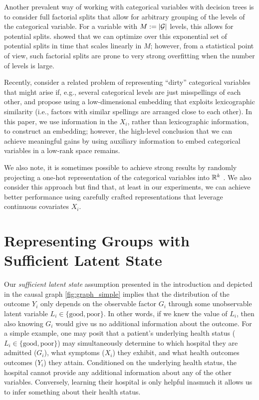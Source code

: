 \documentclass{article}
\theoremstyle{plain}
\theoremstyle{definition}
\theoremstyle{remark}
\begin{document}
Another prevalent way of working with categorical variables with decision trees
is to consider full factorial splits that allow for arbitrary grouping of the levels of the categorical
variable. For a variable with $M := \left\lvert\mathcal{G}\right\rvert$ levels, this allows
for  potential splits. \citet{breiman1984classification} showed that
we can optimize over this exponential set of potential splits in time that scales linearly in $M$;
however, from a statistical point of view, such factorial splits are prone to very strong overfitting
when the number of levels is large.

Recently, \citet{cerda2018similarity} consider a related problem of representing ``dirty'' categorical
variables that might arise if, e.g., several categorical levels are just misspellings of each other, and
propose using a low-dimensional embedding that exploits lexicographic similarity (i.e., factors with
similar spellings are arranged close to each other). In this paper, we use information in the $X_i$,
rather than lexicographic information, to construct an embedding; however, the high-level conclusion
that we can achieve meaningful gains by using auxiliary information to embed categorical variables in
a low-rank space remains.

We also note, it is sometimes possible to achieve strong results by randomly projecting a one-hot
representation of the categorical variables into $\mathbb{R}^k$ \citep{rahimi2008random}. We also
consider this approach but find that, at least in our experiments, we can achieve better
performance using carefully crafted representations that leverage continuous covariates $X_i$.








\section{Representing Groups with Sufficient Latent State}

Our \emph{sufficient latent state} assumption presented in the introduction and depicted in the causal graph \ref{fig:graph_simple} implies that the distribution of the outcome $Y_{i}$ only depends on the observable factor $G_{i}$ through some unobservable latent variable $L_{i} \in \{\text{good}, \text{poor} \}$. In other words, if we knew the value of $L_{i}$, then also knowing $G_{i}$ would give us no additional information about the outcome. For a simple example, one may posit that a patient's underlying health status ($L_{i} \in \{\text{good}, \text{poor}\}$) may simultaneously determine to which hospital they are admitted ($G_{i}$), what symptoms ($X_i$) they exhibit, and what health outcomes outcomes ($Y_i$) they attain. Conditioned on the underlying health status, the hospital cannot provide any additional information about any of the other variables. Conversely, learning their hospital is only helpful inasmuch it allows us to infer something about their health status.
\end{document}
